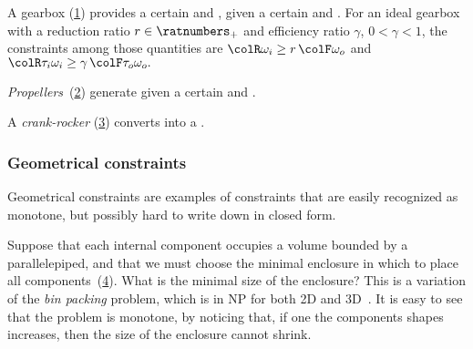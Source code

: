 \begin{example}
    A gearbox (\cref{fig:gearbox}) provides a certain  and , given a certain
     and .
    For an ideal gearbox with a reduction ratio $r \in \ratnumbers_+$ and efficiency ratio $\gamma$, $0<\gamma<1$, the constraints among those quantities are ${\colR \omega_i}\geq r\,{\colF \omega_o}$
    and ${\colR \tau_i\omega_i}\geq\gamma\,{\colF \tau_o\omega_o}.$
\end{example}
\begin{figure}[h]
    \centering
    \caption{}
    \label{fig:gearbox}
\end{figure}


\begin{example}
    \emph{Propellers}~(\cref{fig:propeller}) generate 
    given a certain  and .
\end{example}
\begin{figure}[h]
    \centering
    \caption{}
    \label{fig:propeller}
\end{figure}

\begin{example}
    A \emph{crank-rocker} (\cref{fig:crack}) converts  into a .
\end{example}
\begin{figure}[h]
    \centering
    \caption{}
    \label{fig:crack}
\end{figure}

\subsubsection{Geometrical constraints}

Geometrical constraints are examples of constraints that are easily recognized as monotone, but possibly hard to write down in closed form.

\begin{example}
    Suppose that each internal component occupies a volume bounded by a parallelepiped, and that we must choose the minimal enclosure in which to place all components~(\cref{fig:packing}).
    What is the minimal size of the enclosure? This is a variation of the \emph{bin packing} problem, which is in NP for both 2D and 3D~\cite{lodi02two}.
    It is easy to see that the problem is monotone, by noticing that, if one the components shapes increases, then the size of the enclosure cannot shrink.
\end{example}
\begin{figure}[tbh]
    \centering
    \caption{}
    \label{fig:packing}
\end{figure}

